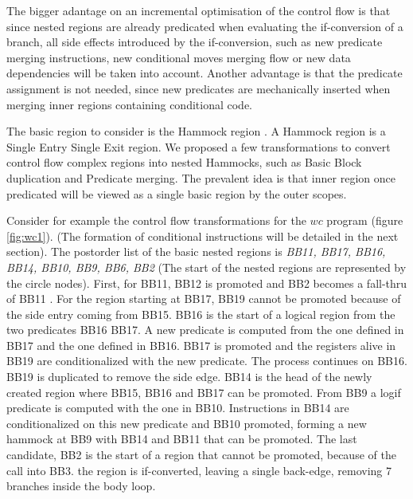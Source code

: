 The bigger adantage on an incremental optimisation of the control flow is that since nested regions are already predicated when evaluating the if-conversion of a branch, all side effects introduced by the if-conversion, such as new predicate merging instructions, new conditional moves merging flow or new data dependencies will be taken into account. Another advantage is that the predicate assignment is not needed, since new predicates are mechanically inserted when merging inner regions containing conditional code.

The basic region to consider is the Hammock region \cite{Ferrante:1987:PDG:24039.24041}. A Hammock region is a Single Entry Single Exit region. We proposed a few transformations to convert control flow complex regions into nested Hammocks, such as Basic Block duplication and Predicate merging. The prevalent idea is that inner region once predicated will be viewed as a single basic region by the outer scopes.

Consider for example the control flow transformations for the $wc$ program (figure \ref{fig:wc1}).
(The formation of conditional instructions will be detailed in the next section).
 The postorder list of the basic nested regions is {\em BB11, BB17, BB16, BB14, BB10, BB9, BB6, BB2} (The start of the nested regions are represented by the circle nodes). First, for BB11, BB12 is promoted and BB2 becomes a fall-thru of BB11 . For the region starting at BB17, BB19 cannot be promoted because of the side entry coming from BB15. BB16 is the start of a logical region from the two predicates BB16 BB17. A new predicate is computed from the one defined in BB17 and the one defined in BB16. BB17 is promoted and the registers alive in BB19 are conditionalized with the new predicate. The process continues on BB16. BB19 is duplicated to remove the side edge. BB14 is the head of the newly created region where BB15, BB16 and BB17 can be promoted. From BB9 a logif predicate is computed with the one in BB10. Instructions in BB14 are conditionalized on this new predicate and BB10 promoted, forming a new hammock at BB9 with BB14 and BB11 that can be promoted. The last candidate, BB2 is the start of a region that cannot be promoted, because of the call into BB3. the region is if-converted, leaving a single back-edge, removing 7 branches inside the body loop.

